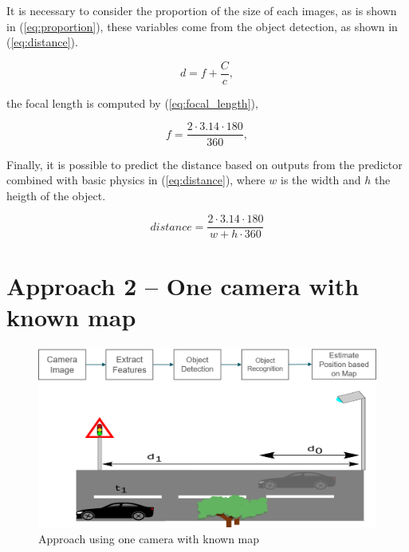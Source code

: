 It is necessary to consider the proportion of the size of each images, as is shown in (\ref{eq:proportion}), these variables come from the object detection, as shown in (\ref{eq:distance}).


\begin{equation}
    \label{eq:proportion}
    d = f + \frac{C}{c},
\end{equation}

the focal length is computed by (\ref{eq:focal_length}), 

\begin{equation}
    \label{eq:focal_length}
    f = \frac{2\cdot 3.14 \cdot 180}{360},
\end{equation}

Finally, it is possible to predict the distance based on outputs from the predictor combined with basic physics in (\ref{eq:distance}), where $w$ is the width and $h$ the heigth of the object.

\begin{equation}
    \label{eq:distance}
    distance = \frac{2 \cdot 3.14 \cdot  180}{w + h \cdot  360}
\end{equation}



 
\section{Approach 2 – One camera with known map}\label{sub:2}
\begin{figure}[H]
\centering
\includegraphics[width=\textwidth]{imagens/proposal2.png}
\caption{Approach using one camera with known map}
\label{fig:proposal2}
\end{figure}



